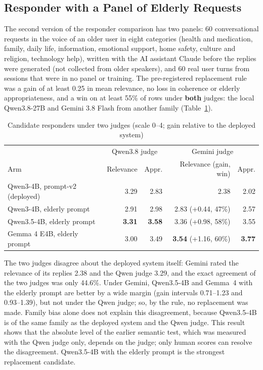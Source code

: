 \subsection{Responder with a Panel of Elderly Requests}

The second version of the responder comparison has two panels: 60 conversational
requests in the voice of an older user in eight categories (health and medication, family,
daily life, information, emotional support, home safety, culture and religion, technology
help), written with the AI assistant Claude before the replies were generated (not collected
from older speakers), and 60 real user turns from sessions that were
in no panel or training. The pre-registered replacement rule was a gain of at least 0.25
in mean relevance, no loss in coherence or elderly appropriateness, and a win on at least
55\% of rows under \textbf{both} judges: the local Qwen3.8-27B and Gemini 3.8 Flash from
another family (Table~\ref{tab:resp-v2}).

\begin{table}[ht]
\centering
\caption{Candidate responders under two judges (scale 0--4; gain relative to the deployed
         system)}
\label{tab:resp-v2}
\small
\begin{tabular}{lrrrr}
\toprule
 & \multicolumn{2}{c}{Qwen3.8 judge} & \multicolumn{2}{c}{Gemini judge} \\
Arm & Relevance & Appr. & Relevance (gain, win) & Appr. \\
\midrule
Qwen3-4B, prompt-v2 (deployed) & 3.29 & 2.83 & 2.38 & 2.02 \\
Qwen3-4B, elderly prompt & 2.91 & 2.98 & 2.83 (+0.44, 47\%) & 2.57 \\
Qwen3.5-4B, elderly prompt & \textbf{3.31} & \textbf{3.58} & 3.36 (+0.98, 58\%) & 3.55 \\
Gemma 4 E4B, elderly prompt & 3.00 & 3.49 & \textbf{3.54} (+1.16, 60\%) & \textbf{3.77} \\
\bottomrule
\end{tabular}
\end{table}

The two judges disagree about the deployed system itself: Gemini rated the relevance of
its replies 2.38 and the Qwen judge 3.29, and the exact agreement of the two judges was
only 44.6\%. Under Gemini, Qwen3.5-4B and Gemma~4 with the elderly prompt are better by a
wide margin (gain intervals 0.71--1.23 and 0.93--1.39), but not under the Qwen judge; so,
by the rule, no replacement was made. Family bias alone does not explain this
disagreement, because Qwen3.5-4B is of the same family as the deployed system and the Qwen
judge. This result shows that the absolute level of the earlier semantic test, which was
measured with the Qwen judge only, depends on the judge; only human scores can resolve the
disagreement. Qwen3.5-4B with the elderly prompt is the strongest replacement candidate.

